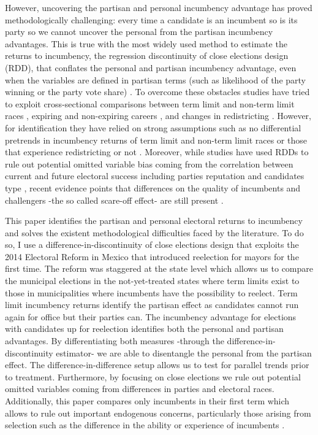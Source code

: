 However, uncovering the partisan and personal incumbency advantage has proved methodologically challenging: every time a candidate is an incumbent so is its party so we cannot uncover the personal from the partisan incumbency advantages. This is true with the most widely used method to estimate the returns to incumbency, the regression discontinuity of close elections design (RDD), that conflates the personal and partisan incumbency advantage, even when the variables are defined in partisan terms (such as likelihood of the party winning or the party vote share) \citep{fowler_hall_2014}. To overcome these obstacles studies have tried to exploit cross-sectional comparisons between term limit and non-term limit races \citep{gelman_king_1990}, expiring and non-expiring careers \citep{fowler_hall_2014}, and changes in redistricting \citep{ansolabehere_snyder_2000, desposato_petrocik_2003, sekhon_titiunik_2012}. However, for identification they have relied on strong assumptions such as no differential pretrends in incumbency returns of term limit and non-term limit races \citep{fowler_hall_2014} or those that experience redistricting or not \citep{ansolabehere_snyder_2004}. %
Moreover,  while studies have used RDDs to rule out potential omitted variable bias coming from the correlation between current and future electoral success including parties reputation and candidates type \citep{klasnja_titiunik_2017}, recent evidence points that differences on the quality of incumbents and challengers -the so called scare-off effect- are still present \citep{eggers_2017}. 

This paper identifies the partisan and personal electoral returns to incumbency and solves the existent methodological difficulties faced by the literature. To do so, I use a difference-in-discontinuity of close elections design that exploits the 2014 Electoral Reform in Mexico that introduced reelection for mayors for the first time. The reform was staggered at the state level which allows us to compare the municipal elections in the not-yet-treated states where term limits exist to those in municipalities where incumbents have the possibility to reelect. Term limit incumbency returns identify the partisan effect as candidates cannot run again for office but their parties can. The incumbency advantage for elections with candidates up for reelection identifies both the personal and partisan advantages. By differentiating both measures -through the difference-in-discontinuity estimator- we are able to disentangle the personal from the partisan effect. The difference-in-difference setup allows us to test for parallel trends prior to treatment. Furthermore, by focusing on close elections we rule out potential omitted variables coming from differences in parties and electoral races. Additionally, this paper compares only incumbents in their first term which allows to rule out important endogenous concerns, particularly those arising from selection such as the difference in the ability or experience of incumbents \citep{ferraz_finan_2008, ferraz_finan_2011}.
 


